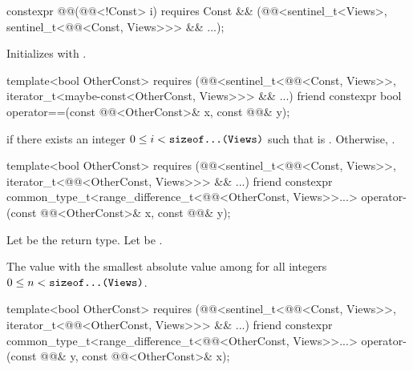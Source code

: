 \begin{itemdecl}
constexpr @@(@@<!Const> i)
  requires Const &&
           (@@<sentinel_t<Views>, sentinel_t<@@<Const, Views>>> && ...);
\end{itemdecl}

\begin{itemdescr}
\pnum
\effects
Initializes  with .
\end{itemdescr}

\begin{itemdecl}
template<bool OtherConst>
  requires (@@<sentinel_t<@@<Const, Views>>,
                         iterator_t<maybe-const<OtherConst, Views>>> && ...)
friend constexpr bool operator==(const @@<OtherConst>& x, const @@& y);
\end{itemdecl}

\begin{itemdescr}
\pnum
\returns
{} if there exists an integer $0 \leq i < \texttt{sizeof...(Views)}$
such that  is .
Otherwise, .
\end{itemdescr}

\begin{itemdecl}
template<bool OtherConst>
  requires (@@<sentinel_t<@@<Const, Views>>,
                               iterator_t<@@<OtherConst, Views>>> && ...)
friend constexpr common_type_t<range_difference_t<@@<OtherConst, Views>>...>
  operator-(const @@<OtherConst>& x, const @@& y);
\end{itemdecl}

\begin{itemdescr}
\pnum
Let  be the return type.
Let  be
.

\pnum
\returns
The value with the smallest absolute value among 
for all integers $0 \leq n < \texttt{sizeof...(Views)}$.
\end{itemdescr}

\begin{itemdecl}
template<bool OtherConst>
  requires (@@<sentinel_t<@@<Const, Views>>,
                               iterator_t<@@<OtherConst, Views>>> && ...)
friend constexpr common_type_t<range_difference_t<@@<OtherConst, Views>>...>
  operator-(const @@& y, const @@<OtherConst>& x);
\end{itemdecl}

